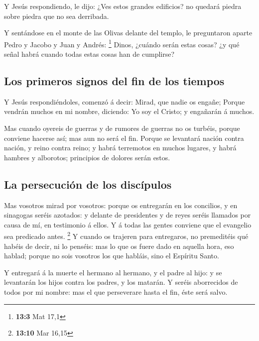  Y Jesús respondiendo, le dijo: ¿Ves estos grandes
edificios? no quedará piedra sobre piedra que no sea derribada.

 Y sentándose en el monte de las Olivas delante del templo,
le preguntaron aparte Pedro y Jacobo y Juan y Andrés: \footnote{\textbf{13:3}
  Mat 17,1}  Dinos, ¿cuándo serán estas cosas? ¿y qué señal
habrá cuando todas estas cosas han de cumplirse?

\hypertarget{los-primeros-signos-del-fin-de-los-tiempos-1}{%
\subsection{Los primeros signos del fin de los
tiempos}\label{los-primeros-signos-del-fin-de-los-tiempos-1}}

 Y Jesús respondiéndoles, comenzó á decir: Mirad, que nadie
os engañe;  Porque vendrán muchos en mi nombre, diciendo: Yo
soy el Cristo; y engañarán á muchos.

 Mas cuando oyereis de guerras y de rumores de guerras no os
turbéis, porque conviene hacerse así; mas aun no será el fin.
 Porque se levantará nación contra nación, y reino contra
reino; y habrá terremotos en muchos lugares, y habrá hambres y
alborotos; principios de dolores serán estos.

\hypertarget{la-persecuciuxf3n-de-los-discuxedpulos}{%
\subsection{La persecución de los
discípulos}\label{la-persecuciuxf3n-de-los-discuxedpulos}}

 Mas vosotros mirad por vosotros: porque os entregarán en
los concilios, y en sinagogas seréis azotados: y delante de presidentes
y de reyes seréis llamados por causa de mí, en testimonio á ellos.
 Y á todas las gentes conviene que el evangelio sea
predicado antes. \footnote{\textbf{13:10} Mar 16,15}  Y
cuando os trajeren para entregaros, no premeditéis qué habéis de decir,
ni lo penséis: mas lo que os fuere dado en aquella hora, eso hablad;
porque no sois vosotros los que habláis, sino el Espíritu Santo.

 Y entregará á la muerte el hermano al hermano, y el padre
al hijo: y se levantarán los hijos contra los padres, y los matarán.
 Y seréis aborrecidos de todos por mi nombre: mas el que
perseverare hasta el fin, éste será salvo.

